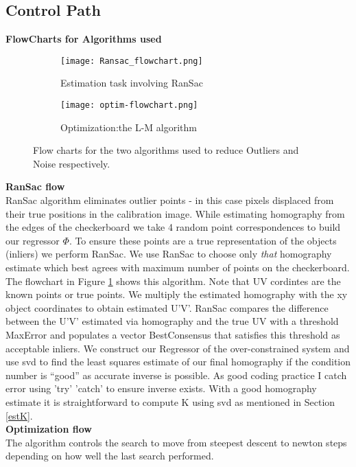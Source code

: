 \documentclass[titlepage]{article}
\begin{document}
\subsection{Control Path}
\begin{center}
\textbf{FlowCharts for Algorithms used}\\
\end{center}
\begin{figure}[H]
\begin{subfigure}{0.5\textwidth}
   \texttt{[image: Ransac\_flowchart.png]}
   \caption{Estimation task involving RanSac}
   \label{Ransac_Flow}
\end{subfigure} 
\begin{subfigure}{0.5\textwidth}
    \texttt{[image: optim-flowchart.png]}
    \caption{Optimization:the L-M algorithm}
  \label{Optim_Flow}
\end{subfigure} 
\caption{Flow charts for the two algorithms used to reduce Outliers and Noise respectively.}
\end{figure}
\textbf{RanSac flow}\\
RanSac algorithm eliminates outlier points - in this case pixels displaced from their true positions in the calibration image. While estimating homography from the edges of the checkerboard we take 4 random point correspondences to build our regressor $\Phi$. To ensure these points are a true representation of the objects (inliers) we perform RanSac.
%
We use RanSac to choose only \textit{that} homography estimate which best agrees with maximum number of points on the checkerboard. The flowchart in Figure \ref{Ransac_Flow} shows this algorithm.
Note that UV cordintes are the known points or true points. We multiply the estimated homography with the xy object coordinates to obtain estimated U’V’. RanSac compares the difference between the U’V’ estimated via homography and the true UV with a threshold MaxError and populates a vector BestConsensus that satisfies this threshold as acceptable inliers. 
We construct our Regressor of the over-constrained system and use svd to find the least squares estimate of our final homography if the condition number is “good” as accurate inverse is possible. As good coding practice I catch error using 'try' 'catch' to ensure inverse exists. With a good homography estimate it is straightforward to compute K using svd as mentioned in Section \ref{estK}.\\
\textbf{Optimization flow}\\
The algorithm controls the search to move from steepest descent to newton steps depending on how well the last search performed. 
\end{document}
